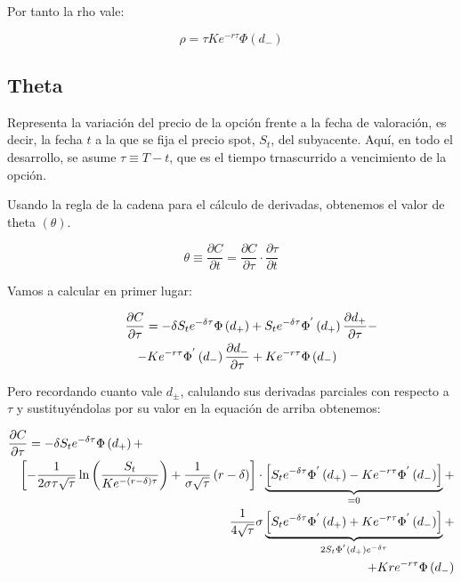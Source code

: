 \documentclass[12pt]{article}
\begin{document}
Por tanto la rho vale:
\newline

\begin{equation}
	\rho = \tau K e^{-r\tau}\Phi\left(d_{-}\right)
\end{equation}
\newline

\subsection{Theta}
Representa la variaci\'{o}n del precio de la opci\'{o}n frente a la fecha de valoraci\'{o}n, es decir, la fecha $t$ a la que se fija el precio
spot, $S_{t}$, del subyacente. Aqu\'{i}, en todo el desarrollo, se asume $\tau\equiv T-t$, que es el tiempo trnascurrido a vencimiento
de la opci\'{o}n.

Usando la regla de la cadena para el c\'{a}lculo de derivadas, obtenemos el valor de theta $(\theta)$.
\newline

\begin{equation}
	\theta \equiv \frac{\partial C}{\partial t} = \frac{\partial C}{\partial \tau} \cdot \frac{\partial \tau}{\partial t}
\end{equation}
\newline


Vamos a calcular en primer lugar:
\newline

\begin{eqnarray}
	\lefteqn{\frac{\partial C}{\partial \tau} = -\delta S_{t}e^{-\delta\tau}\Phi\left(d_{+}\right)+S_{t}e^{-\delta\tau}\Phi
		^{'}\left(d_{+}\right)\frac{\partial d_{+}}{\partial \tau} - } \nonumber \\
	 & & - Ke^{-r\tau}\Phi^{'}\left(d_{-}\right)\frac{\partial d_{-}}{\partial \tau} + Ke^{-r\tau}\Phi\left(d_{-}\right)
\end{eqnarray}
\newline

Pero recordando cuanto vale $d_{\pm}$, calulando sus derivadas parciales con respecto a $\tau$ y sustituy\'{e}ndolas por su
valor en la equaci\'{o}n de arriba obtenemos:
\newline

\begin{eqnarray*}
	\lefteqn{\frac{\partial C}{\partial \tau} = -\delta S_{t}e^{-\delta\tau}\Phi\left(d_{+}\right) +} \\
	 & & \left[-\frac{1}{2\sigma\tau\sqrt{\tau}}\ln\left(\frac{S_{t}}{Ke^{-\left(r-\delta\right)\tau}}\right) + 
		\frac{1}{\sigma\sqrt{\tau}}\left(r-\delta\right)\right]\cdot\underbrace{\left[S_{t}e^{-\delta\tau}\Phi^{'}
		\left(d_{+}\right)-Ke^{-r\tau}\Phi^{'}\left(d_{-}\right)\right]}_{=0} + \\
	 & & \frac{1}{4\sqrt{\tau}}\sigma\underbrace{\left[S_{t}e^{-\delta\tau}\Phi^{'}\left(d_{+}\right) + Ke^{-r\tau}\Phi^{'}\left(
		d_{-}\right)\right]}_{2S_{t}\Phi^{'}\left(d_{+}\right)e^{-\delta\tau}} + \\
	 & & + Kre^{-r\tau}\Phi\left(d_{-}\right)
\end{eqnarray*}
\end{document}
